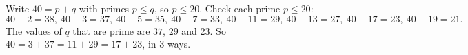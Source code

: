 Write $40=p+q$ with primes $p\le q$, so $p\le20$. Check each prime $p\le20$:
\[
40-2=38,\ 40-3=37,\ 40-5=35,\ 40-7=33,\ 40-11=29,\ 40-13=27,\ 40-17=23,\ 40-19=21 .
\]
The values of $q$ that are prime are $37$, $29$ and $23$. So $40=3+37=11+29=17+23$, in $\boxed{3}$ ways.
